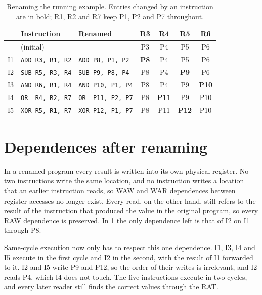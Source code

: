 \documentclass[../main.tex]{subfiles}
\begin{document}
\begin{table}[htbp]
  \centering\small
  \caption{Renaming the running example.  Entries changed by an instruction
    are in bold; R1, R2 and R7 keep P1, P2 and P7 throughout.}
  \label{tab:l06-rename}
  \begin{tabular}{@{}lllcccc@{}}
    \toprule
    & Instruction & Renamed & R3 & R4 & R5 & R6 \\
    \midrule
    & (initial) & & P3 & P4 & P5 & P6 \\
    I1 & \texttt{ADD R3, R1, R2} & \texttt{ADD P8, P1, P2}
       & \textbf{P8} & P4 & P5 & P6 \\
    I2 & \texttt{SUB R5, R3, R4} & \texttt{SUB P9, P8, P4}
       & P8 & P4 & \textbf{P9} & P6 \\
    I3 & \texttt{AND R6, R1, R4} & \texttt{AND P10, P1, P4}
       & P8 & P4 & P9 & \textbf{P10} \\
    I4 & \texttt{OR~~R4, R2, R7} & \texttt{OR~~P11, P2, P7}
       & P8 & \textbf{P11} & P9 & P10 \\
    I5 & \texttt{XOR R5, R1, R7} & \texttt{XOR P12, P1, P7}
       & P8 & P11 & \textbf{P12} & P10 \\
    \bottomrule
  \end{tabular}
\end{table}

\section{Dependences after renaming}
\label{sec:l06-after-renaming}

In a renamed program every result is written into its own physical
register.  No two instructions write
the same location, and no instruction writes a location that an earlier
instruction reads, so WAW and WAR dependences between register accesses no
longer exist.  Every read,
on the other hand, still refers to the result of the instruction that
produced the value in the original program, so every RAW dependence is
preserved.  In \cref{tab:l06-rename} the only dependence left is that of I2
on I1 through P8.

Same-cycle execution now only has to respect this one dependence.  I1, I3,
I4 and I5 execute in the first cycle and I2 in the second, with the result
of I1 forwarded to it.  I2 and I5 write P9 and P12, so the order of their
writes is irrelevant, and I2 reads P4, which I4 does not touch.  The five
instructions execute in two cycles, and every later reader still finds the
correct values through the RAT.
\end{document}
